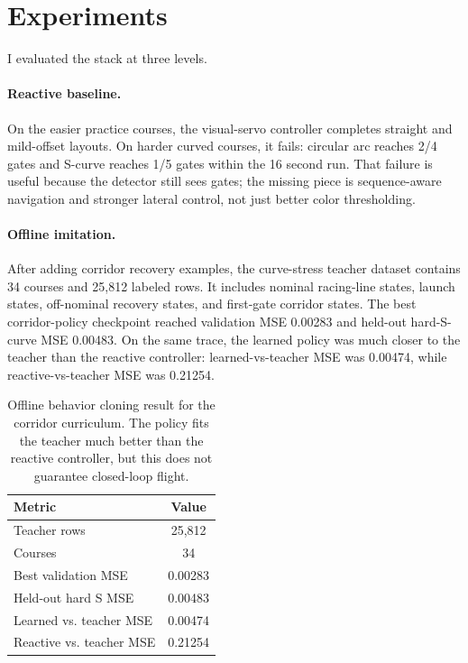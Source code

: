 \documentclass[11pt]{article}
\begin{document}
\section{Experiments}

I evaluated the stack at three levels.

\paragraph{Reactive baseline.}
On the easier practice courses, the visual-servo controller completes straight and mild-offset layouts. On harder curved courses, it fails: circular arc reaches 2/4 gates and S-curve reaches 1/5 gates within the 16 second run. That failure is useful because the detector still sees gates; the missing piece is sequence-aware navigation and stronger lateral control, not just better color thresholding.

\paragraph{Offline imitation.}
After adding corridor recovery examples, the curve-stress teacher dataset contains 34 courses and 25,812 labeled rows. It includes nominal racing-line states, launch states, off-nominal recovery states, and first-gate corridor states. The best corridor-policy checkpoint reached validation MSE 0.00283 and held-out hard-S-curve MSE 0.00483. On the same trace, the learned policy was much closer to the teacher than the reactive controller: learned-vs-teacher MSE was 0.00474, while reactive-vs-teacher MSE was 0.21254.

\begin{table}[t]
\centering
\small
\begin{tabular}{lc}
\toprule
Metric & Value \\
\midrule
Teacher rows & 25,812 \\
Courses & 34 \\
Best validation MSE & 0.00283 \\
Held-out hard S MSE & 0.00483 \\
Learned vs. teacher MSE & 0.00474 \\
Reactive vs. teacher MSE & 0.21254 \\
\bottomrule
\end{tabular}
\caption{Offline behavior cloning result for the corridor curriculum. The policy fits the teacher much better than the reactive controller, but this does not guarantee closed-loop flight.}
\label{tab:offline}
\end{table}
\end{document}
